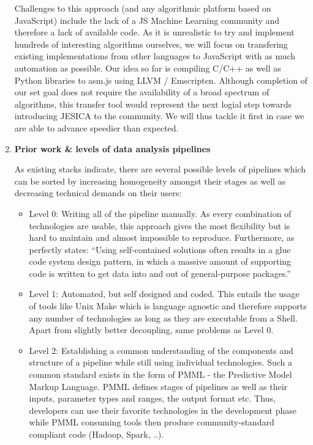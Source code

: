 \documentclass[a4paper,10pt]{article}
\begin{document}
\begin{enumerate}
Challenges to this approach (and any algorithmic platform based on JavaScript) include the lack of a JS Machine Learning community and therefore a lack of available code. As it is unrealistic to try and implement hundreds of interesting algorithms ourselves, we will focus on transfering existing implementations from other languages to JavaScript with as much automation as possible. Our idea so far is compiling C/C++ as well as Python libraries to asm.js using LLVM / Emscripten. Although completion of our set goal does not require the availability of a broad spectrum of algorithms, this transfer tool would represent the next logial step towards introducing JESICA to the community. We will thus tackle it first in case we are able to advance speedier than expected.




\item \textbf{Prior work \& levels of data analysis pipelines }

As existing stacks indicate, there are several possible levels of pipelines which can be sorted by increasing homogeneity amongst their stages as well as decreasing technical demands on their users:

\begin{itemize}
 \item Level 0: Writing all of the pipeline manually. As every combination of technologies are usable, this approach gives the most flexibility but is hard to maintain and almost impossible to reproduce. Furthermore, as \citep{MLTechnicalDebt} perfectly states: ``Using self-contained solutions often results in a glue code system design pattern, in which a massive amount of supporting code is written to get data into and out of general-purpose packages.''

 \item Level 1: Automated, but self designed and coded. This entails the usage of tools like Unix Make which is language agnostic and therefore supports any number of technologies as long as they are executable from a Shell. Apart from slightly better decoupling, same problems as Level 0.

 \item Level 2: Establishing a common understanding of the components and structure of a pipeline while still using individual technologies. Such a common standard exists in the form of PMML - the Predictive Model Markup Language. PMML defines stages of pipelines as well as their inputs, parameter types and ranges, the output format etc. Thus, developers can use their favorite technologies in the development phase while PMML consuming tools then produce community-standard compliant code (Hadoop, Spark, ..).


\end{itemize}
\end{enumerate}
\end{document}
